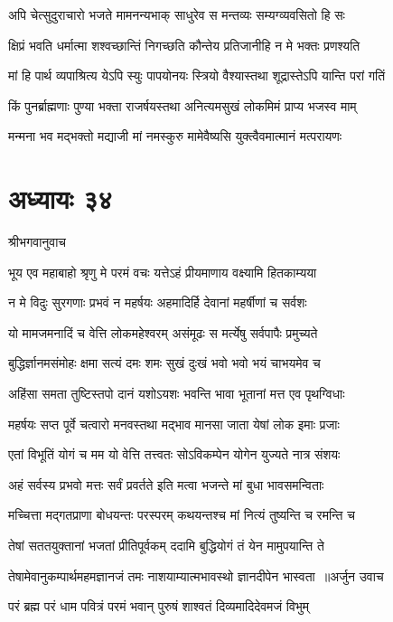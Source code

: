 \twolineshloka
{अपि चेत्सुदुराचारो भजते मामनन्यभाक्}
{साधुरेव स मन्तव्यः सम्यग्व्यवसितो हि सः}


\threelineshloka
{क्षिप्रं भवति धर्मात्मा शश्वच्छान्तिं निगच्छति}
{कौन्तेय प्रतिजानीहि न मे भक्तः प्रणश्यति}
{}


\twolineshloka
{मां हि पार्थ व्यपाश्रित्य येऽपि स्युः पापयोनयः}
{स्त्रियो वैश्यास्तथा शूद्रास्तेऽपि यान्ति परां गतिं}


\twolineshloka
{किं पुनर्ब्राह्मणाः पुण्या भक्ता राजर्षयस्तथा}
{अनित्यमसुखं लोकमिमं प्राप्य भजस्व माम्}


\twolineshloka
{मन्मना भव मद्भक्तो मद्याजी मां नमस्कुरु}
{मामेवैष्यसि युक्त्वैवमात्मानं मत्परायणः}


\chapter{अध्यायः ३४}
\twolineshloka
{श्रीभगवानुवाच}
{}


\twolineshloka
{भूय एव महाबाहो श्रृणु मे परमं वचः}
{यत्तेऽहं प्रीयमाणाय वक्ष्यामि हितकाम्यया}


\twolineshloka
{न मे विदुः सुरगणाः प्रभवं न महर्षयः}
{अहमादिर्हि देवानां महर्षीणां च सर्वशः}


\twolineshloka
{यो मामजमनादिं च वेत्ति लोकमहेश्वरम्}
{असंमूढः स मर्त्येषु सर्वपापैः प्रमुच्यते}


\twolineshloka
{बुद्धिर्ज्ञानमसंमोहः क्षमा सत्यं दमः शमः}
{सुखं दुःखं भवो भवो भयं चाभयमेव च}


\twolineshloka
{अहिंसा समता तुष्टिस्तपो दानं यशोऽयशः}
{भवन्ति भावा भूतानां मत्त एव पृथग्विधाः}


\twolineshloka
{महर्षयः सप्त पूर्वे चत्वारो मनवस्तथा}
{मद्भाव मानसा जाता येषां लोक इमाः प्रजाः}


\twolineshloka
{एतां विभूतिं योगं च मम यो वेत्ति तत्त्वतः}
{सोऽविकम्पेन योगेन युज्यते नात्र संशयः}


\twolineshloka
{अहं सर्वस्य प्रभवो मत्तः सर्वं प्रवर्तते}
{इति मत्वा भजन्ते मां बुधा भावसमन्विताः}


\twolineshloka
{मच्चित्ता मद्गतप्राणा बोधयन्तः परस्परम्}
{कथयन्तश्च मां नित्यं तुष्यन्ति च रमन्ति च}


\twolineshloka
{तेषां सततयुक्तानां भजतां प्रीतिपूर्वकम्}
{ददामि बुद्धियोगं तं येन मामुपयान्ति ते}


\threelineshloka
{तेषामेवानुकम्पार्थमहमज्ञानजं तमः}
{नाशयाम्यात्मभावस्थो ज्ञानदीपेन भास्वता ॥अर्जुन उवाच}
{}


\twolineshloka
{परं ब्रह्म परं धाम पवित्रं परमं भवान्}
{पुरुषं शाश्वतं दिव्यमादिदेवमजं विभुम्}


